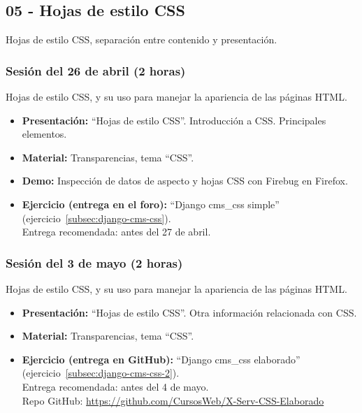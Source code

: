 \documentclass[a4paper,12pt]{article}
\begin{document}
\subsection{05 - Hojas de estilo CSS}

Hojas de estilo CSS, separación entre contenido y presentación.

\subsubsection{Sesión del 26 de abril (2 horas)}

Hojas de estilo CSS, y su uso para manejar la apariencia de las páginas HTML.

\begin{itemize}
\item \textbf{Presentación:} ``Hojas de estilo CSS''. Introducción a CSS. Principales elementos.
 \item \textbf{Material:} Transparencias, tema ``CSS''.
\item \textbf{Demo:} Inspección de datos de aspecto y hojas CSS con Firebug en Firefox.
\item \textbf{Ejercicio (entrega en el foro):} ``Django cms\_css simple'' (ejercicio~\ref{subsec:django-cms-css}). \\
Entrega recomendada: antes del 27 de abril.
\end{itemize}

\subsubsection{Sesión del 3 de mayo (2 horas)}

Hojas de estilo CSS, y su uso para manejar la apariencia de las páginas HTML.

\begin{itemize}
\item \textbf{Presentación:} ``Hojas de estilo CSS''. Otra información relacionada con CSS.
 \item \textbf{Material:} Transparencias, tema ``CSS''.
\item \textbf{Ejercicio (entrega en GitHub):} ``Django cms\_css elaborado'' (ejercicio~\ref{subsec:django-cms-css-2}). \\
  Entrega recomendada: antes del 4 de mayo. \\
  Repo GitHub: \url{https://github.com/CursosWeb/X-Serv-CSS-Elaborado}
\end{itemize}
\end{document}
